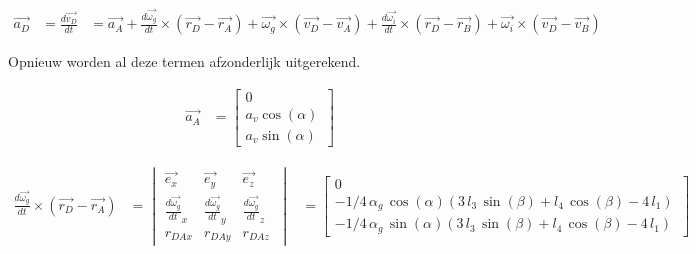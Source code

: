 \begin{equation}
\begin{split}
\overrightarrow{a_{D}}&=\frac{d\overrightarrow{v_{D}}}{dt}
&=	\overrightarrow{a_{A}} + \frac{d\overrightarrow{\omega_{g}}}{dt}\times(\overrightarrow{r_{D}}-\overrightarrow{r_{A}}) + \overrightarrow{\omega_{g}}\times(\overrightarrow{v_{D}}-\overrightarrow{v_{A}}) + \frac{d\overrightarrow{\omega_i}}{dt}\times(\overrightarrow{r_{D}}-\overrightarrow{r_{B}})+\overrightarrow{\omega_{i}}\times(\overrightarrow{v_{D}}-\overrightarrow{v_{B}})
\end{split}
\end{equation}

Opnieuw worden al deze termen afzonderlijk uitgerekend.

\begin{equation*}
\begin{split}
\overrightarrow{a_{A}}
&=	\begin{bmatrix}
	0\\
	a_v\cos(\alpha)\\
	a_v\sin(\alpha)\
	\end{bmatrix}
\end{split}
\end{equation*}

\begin{equation*}
\begin{split}
\frac{d\overrightarrow{\omega_{g}}}{dt}\times(\overrightarrow{r_{D}}-\overrightarrow{r_{A}})
&=	\begin{vmatrix}
	\overrightarrow{e_{x}} & \overrightarrow{e_{y}} & \overrightarrow{e_{z}}\\
	\frac{d\overrightarrow{\omega_g}}{dt}_{x} & \frac{d\overrightarrow{\omega_g}}{dt}_{y} & \frac{d\overrightarrow{\omega_g}}{dt}_{z}\\
	r_{DAx} & r_{DAy} & r_{DAz}\
	\end{vmatrix}
&=	\begin{bmatrix}
	0\\
	-1/4\,\alpha_{g}\,\cos\left( \alpha \right)  \left( 3\,l_{3}\,\sin \left( \beta \right) +l_{4}\,\cos \left( \beta \right) -4\,l_{1} \right) \\
	-1/4\,\alpha_{g}\,\sin \left( \alpha \right)  \left( 3\,l_{3}\,\sin\left( \beta \right) +l_{4}\,\cos \left( \beta \right) -4\,l_{1}\right) \
	\end{bmatrix}
\end{split}
\end{equation*}

